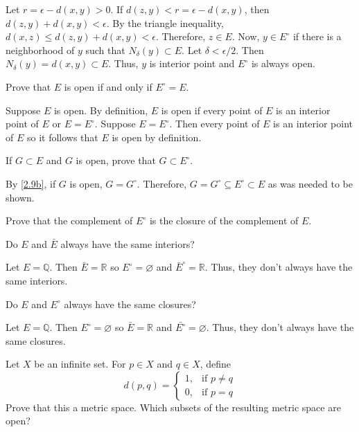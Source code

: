 \begin{exercise}
\begin{exercise}[label = (\alph*), ref = \arabic{exercisei}(\alph*)]
    Let \(r = \epsilon - d(x,y) > 0\).
    If \(d(z,y) < r = \epsilon - d(x,y)\), then \(d(z,y) + d(x,y) < \epsilon\).
    By the triangle inequality, \(d(x,z)\leq d(z,y) + d(x,y) < \epsilon\).
    Therefore, \(z\in E\).
    Now, \(y\in E^{\circ}\) if there is a neighborhood of \(y\) such that
    \(N_{\delta}(y)\subset E\).
    Let \(\delta < \epsilon/2\).
    Then \(N_{\delta}(y) = d(x,y)\subset E\).
    Thus, \(y\) is interior point and \(E^{\circ}\) is always open.
  \item
    \label{2.9b}
    Prove that \(E\) is open if and only if \(E^{\circ} = E\).
    \par\smallskip
    Suppose \(E\) is open.
    By definition, \(E\) is open if every point of \(E\) is an interior point
    of \(E\) or \(E = E^{\circ}\).
    Suppose \(E = E^{\circ}\).
    Then every point of \(E\) is an interior point of \(E\) so it follows that
    \(E\) is open by definition.
  \item
    If \(G\subset E\) and \(G\) is open, prove that \(G\subset E^{\circ}\).
    \par\smallskip
    By \cref{2.9b}, if \(G\) is open, \(G = G^{\circ}\).
    Therefore, \(G = G^{\circ}\subseteq E^{\circ}\subset E\) as was needed to
    be shown.
  \item
    Prove that the complement of \(E^{\circ}\) is the closure of the
    complement of \(E\).
  \item
    Do \(E\) and \(\bar{E}\) always have the same interiors?
    \par\smallskip
    Let \(E = \mathbb{Q}\).
    Then \(\bar{E} = \mathbb{R}\) so \(E^{\circ} = \varnothing\) and
    \(\bar{E}^{\circ} = \mathbb{R}\).
    Thus, they don't always have the same interiors.
  \item
    Do \(E\) and \(E^{\circ}\) always have the same closures?
    \par\smallskip
    Let \(E = \mathbb{Q}\).
    Then \(E^{\circ} = \varnothing\) so \(\bar{E} = \mathbb{R}\) and
    \(\bar{E^{\circ}} = \varnothing\).
    Thus, they don't always have the same closures.
  \end{exercise}
\item
  Let \(X\) be an infinite set.
  For \(p\in X\) and \(q\in X\), define
  \[
  d(p, q) =
  \begin{cases}
    1, & \text{if } p\neq q\\
    0, & \text{if } p = q
  \end{cases}
  \]
  Prove that this a metric space.
  Which subsets of the resulting metric space are open?

\end{exercise}
